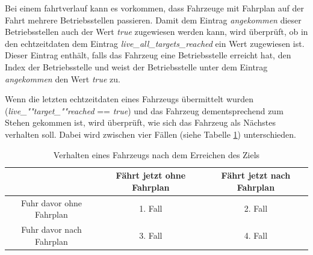 Bei einem \Gls{fahrtverlauf} kann es vorkommen, dass Fahrzeuge mit Fahrplan auf der Fahrt mehrere Betriebsstellen passieren. Damit dem Eintrag \textit{angekommen} dieser Betriebsstellen auch der Wert \textit{true} zugewiesen werden kann, wird überprüft, ob in den \Gls{echtzeitdaten} dem Eintrag \textit{live\_all\_targets\_reached} ein Wert zugewiesen ist. Dieser Eintrag enthält, falls das Fahrzeug eine Betriebsstelle erreicht hat, den Index der Betriebsstelle und weist der Betriebsstelle unter dem Eintrag \textit{angekommen} den Wert \textit{true} zu.

Wenn die letzten \Gls{echtzeitdaten} eines Fahrzeugs übermittelt wurden (\textit{live\_""target\_""reached} == \textit{true}) und das Fahrzeug dementsprechend zum Stehen gekommen ist, wird überprüft, wie sich das Fahrzeug als Nächstes verhalten soll. Dabei wird zwischen vier Fällen (siehe Tabelle \ref{table:vierfaelle}) unterschieden.
\begin{table}
\begin{center}
\renewcommand{\arraystretch}{1.2}
\begin{tabular}{c|c|c}
 & Fährt jetzt ohne Fahrplan & Fährt jetzt nach Fahrplan \\ \hline
Fuhr davor ohne Fahrplan                 		&    1. Fall         & 2. Fall       \\ \hline
Fuhr davor nach Fahrplan                   		&    3. Fall         & 4. Fall       \\ 
\end{tabular}
\renewcommand{\arraystretch}{1}
\caption{Verhalten eines Fahrzeugs nach dem Erreichen des Ziels}
\label{table:vierfaelle}
\end{center}
\end{table}
